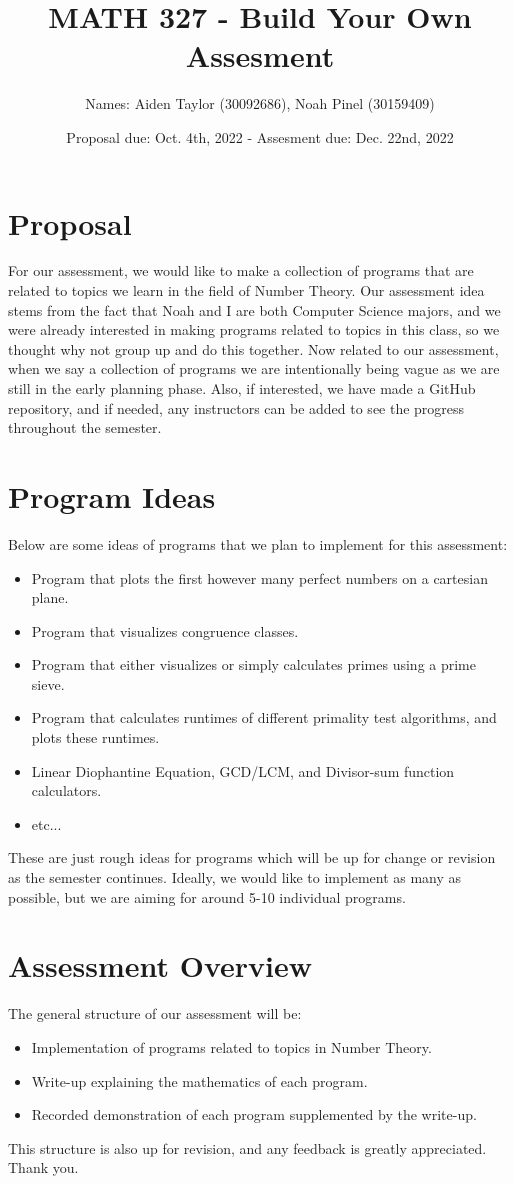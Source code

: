 \documentclass[11pt]{article}
\title{MATH 327 - Build Your Own Assesment}
\author{Names: Aiden Taylor (30092686), Noah Pinel (30159409)}
\date{Proposal due: Oct. 4th, 2022 - Assesment due: Dec. 22nd, 2022}
\begin{document}
\maketitle
\newpage
\section*{Proposal}
For our assessment, we would like to make a collection of programs that are related to topics we learn in the field of Number Theory.
Our assessment idea stems from the fact that Noah and I are both Computer Science majors, and we were already interested in making programs related to topics in this class, so we thought why not group up and do this together.
Now related to our assessment, when we say a collection of programs we are intentionally being vague as we are still in the early planning phase.
Also, if interested, we have made a GitHub repository, and if needed, any instructors can be added to see the progress throughout the semester.
\section*{Program Ideas}
Below are some ideas of programs that we plan to implement for this assessment:
\begin{itemize}
\item Program that plots the first however many perfect numbers on a cartesian plane.
\item Program that visualizes congruence classes.
\item Program that either visualizes or simply calculates primes using a prime sieve.
\item Program that calculates runtimes of different primality test algorithms, and plots these runtimes.
\item Linear Diophantine Equation, GCD/LCM, and Divisor-sum function calculators.
\item etc...
\end{itemize}
These are just rough ideas for programs which will be up for change or revision as the semester continues.
Ideally, we would like to implement as many as possible, but we are aiming for around 5-10 individual programs.
\section*{Assessment Overview}
The general structure of our assessment will be:
\begin{itemize}
\item Implementation of programs related to topics in Number Theory.
\item Write-up explaining the mathematics of each program.
\item Recorded demonstration of each program supplemented by the write-up.
\end{itemize}
This structure is also up for revision, and any feedback is greatly appreciated. Thank you.
\end{document}
